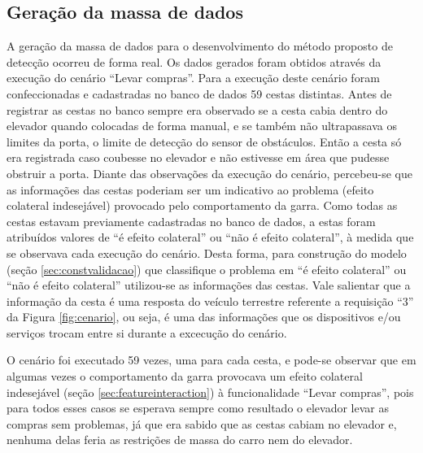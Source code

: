 \subsection{Geração da massa de dados}
\label{subsec:geracaodados}
A geração da massa de dados para o desenvolvimento do método proposto de detecção ocorreu de forma real. Os dados gerados foram obtidos através da execução do cenário ``Levar compras''. Para a execução deste cenário foram confeccionadas e cadastradas no banco de dados 59 cestas distintas. Antes de registrar as cestas no banco sempre era observado se a cesta cabia dentro do elevador quando colocadas de forma manual, e se também não ultrapassava os limites da porta, o limite de detecção do sensor de obstáculos. Então a cesta só era registrada caso coubesse no elevador e não estivesse em área que pudesse obstruir a porta. Diante das observações da execução do cenário, percebeu-se que as informações das cestas poderiam ser um indicativo ao problema (efeito colateral indesejável) provocado pelo comportamento da garra. Como todas as cestas estavam previamente cadastradas no banco de dados, a estas foram atribuídos valores de ``é efeito colateral'' ou ``não é efeito colateral'', à medida que se observava cada execução do cenário. Desta forma, para construção do modelo (seção \ref{sec:constvalidacao}) que classifique o problema em ``é efeito colateral'' ou ``não é efeito colateral'' utilizou-se as informações das cestas. Vale salientar que a informação da cesta é uma resposta do veículo terrestre referente a requisição ``3'' da Figura \ref{fig:cenario}, ou seja, é uma das informações que os dispositivos e/ou serviços trocam entre si durante a excecução do cenário.

O cenário foi executado 59 vezes, uma para cada cesta, e pode-se observar que em algumas vezes o comportamento da garra provocava um efeito colateral indesejável (seção \ref{sec:featureinteraction}) à funcionalidade ``Levar compras'', pois para todos esses casos se esperava sempre como resultado o elevador levar as compras sem problemas, já que era sabido que as cestas cabiam no elevador e, nenhuma delas feria as restrições de massa do carro nem do elevador. 

